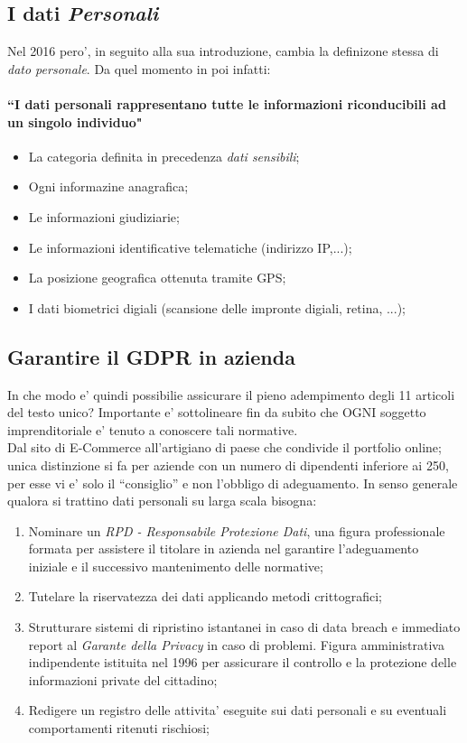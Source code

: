 \documentclass[a4paper,12pt]{article}
\begin{document}
\subsection{I dati \textit{Personali}}
Nel 2016 pero', in seguito alla sua introduzione, cambia la definizone stessa di \textit{dato personale}. Da quel momento in poi infatti: 
\paragraph{``I dati personali rappresentano tutte le informazioni riconducibili ad un singolo individuo"}

\begin{itemize}
    \item La categoria definita in precedenza \textit{dati sensibili};
    \item Ogni informazine anagrafica;
    \item Le informazioni giudiziarie;
    \item Le informazioni identificative telematiche (indirizzo IP,...);
    \item La posizione geografica ottenuta tramite GPS;
    \item I dati biometrici digiali (scansione delle impronte digiali, retina, ...);
\end{itemize}

\subsection{Garantire il GDPR in azienda}
In che modo e' quindi possibilie assicurare il pieno adempimento degli 11 articoli del testo unico?
Importante e' sottolineare fin da subito che OGNI soggetto imprenditoriale e' tenuto a conoscere tali normative. \\
Dal sito di E-Commerce all'artigiano di paese che condivide il portfolio online; unica distinzione si fa per aziende con un numero di dipendenti inferiore ai 250, per esse vi e' solo il ``consiglio'' e non l'obbligo di adeguamento. In senso generale qualora si trattino dati personali su larga scala bisogna:
\begin{enumerate}
    \item Nominare un \textit{RPD - Responsabile Protezione Dati}, una figura professionale formata per assistere il titolare in azienda 
    nel garantire l'adeguamento \\ iniziale e il successivo mantenimento delle normative;
    \item Tutelare la riservatezza dei dati applicando metodi crittografici;
    \item Strutturare sistemi di ripristino istantanei in caso di data breach e immediato report al \textit{Garante della Privacy} in caso di problemi. 
    Figura amministrativa indipendente istituita nel 1996 per assicurare il controllo e la protezione delle informazioni private del cittadino;
    \item Redigere un registro delle attivita' eseguite sui dati personali e su eventuali comportamenti ritenuti rischiosi;
\end{enumerate}
\end{document}
